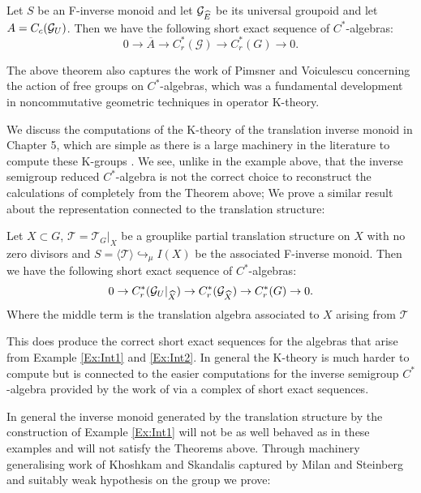 \begin{thm}\label{Ex:Int3}
Let $S$ be an F-inverse monoid and let $\mathcal{G}_{\widehat{E}}$ be its universal groupoid and let $A=C_{c}(\mathcal{G}_{U})$. Then we have the following  short exact sequence of $C^{*}$-algebras:
\begin{equation*}
0 \rightarrow \overline{A} \rightarrow C^{*}_{r}(\mathcal{G}) \rightarrow C^{*}_{r}(G) \rightarrow 0.
\end{equation*}
\end{thm}

The above theorem also captures the work of Pimsner and Voiculescu \cite{MR670181} concerning the action of free groups on $C^{*}$-algebras, which was a fundamental development in noncommutative geometric techniques in operator K-theory.

We discuss the computations of the K-theory of the translation inverse monoid in Chapter 5, which are simple as there is a large machinery in the literature to compute these K-groups \cite{Nor-2012,CEL-2}. We see, unlike in the example above, that the inverse semigroup reduced $C^{*}$-algebra is not the correct choice to reconstruct the calculations of \cite{MR670181} completely from the Theorem above; We prove a similar result about the representation connected to the translation structure:

\begin{thm}
Let $X \subset G$, $\mathcal{T}=\mathcal{T}_{G}|_{X}$ be a grouplike partial translation structure on $X$ with no zero divisors and $S=\langle \mathcal{T} \rangle \hookrightarrow_{\mu} I(X)$ be the associated F-inverse monoid. Then we have the following short exact sequence of $C^{*}$-algebras:
\begin{equation}\label{eqn1}
0 \rightarrow C^{*}_{r}(\mathcal{G}_{U}|_{\widehat{X}}) \rightarrow C^{*}_{r}(\mathcal{G}_{\widehat{X}}) \rightarrow C^{*}_{r}(G) \rightarrow 0.
\end{equation}
Where the middle term is the translation algebra associated to $X$ arising from $\mathcal{T}$
\end{thm}

This does produce the correct short exact sequences for the algebras that arise from Example \ref{Ex:Int1} and \ref{Ex:Int2}. In general the K-theory is much harder to compute but is connected to the easier computations for the inverse semigroup $C^{*}$-algebra provided by the work of \cite{Nor-2012,CEL-2} via a complex of short exact sequences.

In general the inverse monoid generated by the translation structure by the construction of Example \ref{Ex:Int1} will not be as well behaved as in these examples and will not satisfy the Theorems above.
Through machinery generalising work of Khoshkam and Skandalis \cite{MR1900993} captured by Milan and Steinberg \cite{Milan-Steinberg} and suitably weak hypothesis on the group we prove:

